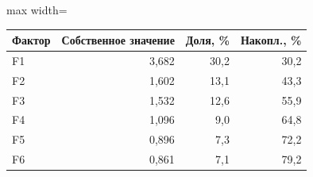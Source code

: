 {%
\small
\setlength{\tabcolsep}{3.0pt}
\renewcommand{\arraystretch}{1.12}
\begin{adjustbox}{max width=\textwidth}
\begin{tabular}{lrrr}
\toprule
Фактор & Собственное значение & Доля, \% & Накопл., \% \\
\midrule
F1 & 3,682 & 30,2 & 30,2 \\
F2 & 1,602 & 13,1 & 43,3 \\
F3 & 1,532 & 12,6 & 55,9 \\
F4 & 1,096 & 9,0 & 64,8 \\
F5 & 0,896 & 7,3 & 72,2 \\
F6 & 0,861 & 7,1 & 79,2 \\
\bottomrule
\end{tabular}
\end{adjustbox}
}